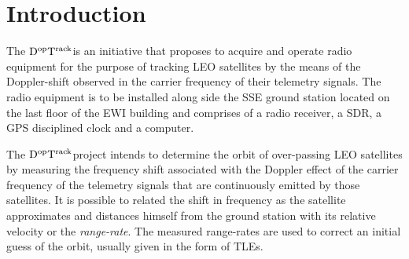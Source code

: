 \documentclass[11pt,a4paper,oneside]{article}
\newcommand{\GroundStationName}{${\rm D^{\rm op}T^{\rm rack}}$}
\begin{document}
\newcommand{\modellna}{SP-7000 LNA}
\newcommand{\modelradio}{AOR AR5001D}
\newcommand{\modelradioswitch}{AOR AS-5001DX}
\newcommand{\modelsdr}{USRP N210}
\newcommand{\modelsdrdb}{USRP BasicRX Daughterboard}
\newcommand{\modelclock}{Spectracom Epsilon Clock EC20S}
\newcommand{\modelsdrrack}{USRP U3 Rack Mount Kits}
\newcommand{\modelantennaVHF}{EB-144 M$^2$}
\newcommand{\modelantennaUHF}{EB-432 M$^2$}
\newcommand{\modelbiasT}{DCC 12/N}
\newcommand{\modellightprot}{N-FF-J01028B0045}
\newcommand{\modelsplitVUHF}{ZFSC-3-1WB-N+}
\newcommand{\modelsplitSband}{ZB3PD-63-N+}
\newcommand{\modelcomputer}{HP Compaq dc7800 Minitower}

\newcommand{\pricelna}{313.45}
\newcommand{\priceradio}{2,689.55}
\newcommand{\priceradioswitch}{83.19}
\newcommand{\pricesdr}{1,490.00}
\newcommand{\pricesdrdb}{66.00}
\newcommand{\priceclock}{2,790.32}
\newcommand{\pricesdrrack}{220.00}
\newcommand{\priceantennaVHF}{254.00}
\newcommand{\priceantennaUHF}{198.00}
\newcommand{\pricebiasT}{207.87}
\newcommand{\pricelightprot}{99.16}
\newcommand{\pricesplitVUHF}{131.29}
\newcommand{\pricesplitSband}{99.90}
\newcommand{\pricecomputer}{0}
\newcommand{\pricemisc}{500}
\newcommand{\pricetax}{1,789.56}
\newcommand{\pricedeliv}{136}
\newcommand{\pricehardcost}{10311.29}
\newcommand{\priceassembly}{800}
\newcommand{\pricemaintenance}{1000/year}
\newcommand{\priceTA}{1000/year}
\newcommand{\priceCourseMat}{200/year}
\newcommand{\pricetotal}{15000}



\section{Introduction}

The \GroundStationName is an initiative that proposes to acquire and operate radio equipment for the purpose of tracking \ac{LEO} satellites by the means of the Doppler-shift observed in the carrier frequency of their telemetry signals. The radio equipment is to be installed along side the \ac{SSE} ground station located on the last floor of the \ac{EWI} building and comprises of a radio receiver, a \ac{SDR}, a \ac{GPS} disciplined clock and a computer.

The \GroundStationName project intends to determine the orbit of over-passing \ac{LEO} satellites by measuring the frequency shift associated with the Doppler effect of the carrier frequency of the telemetry signals that are continuously emitted by those satellites. It is possible to related the shift in frequency as the satellite approximates and distances himself from the ground station with its relative velocity or the \emph{range-rate}. The measured range-rates are used to correct an initial guess of the orbit, usually given in the form of \acp{TLE}.
\end{document}
